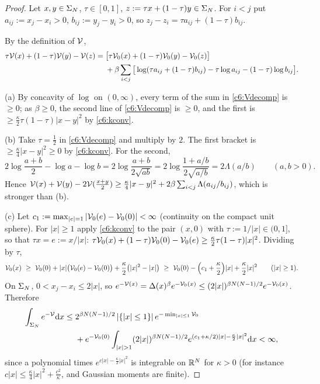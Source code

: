 \begin{proof}
Let $x,y\in\Sigma_N$, $\tau\in[0,1]$, $z:=\tau x+(1-\tau)y\in\Sigma_N$. For $i<j$ put $a_{ij}:=x_j-x_i>0$, $b_{ij}:=y_j-y_i>0$, so $z_j-z_i=\tau a_{ij}+(1-\tau)b_{ij}$.

By the definition of $\mathcal{V}$,
\begin{align}\label{c6:Vdecomp}
\tau\mathcal{V}(x)+(1-\tau)\mathcal{V}(y)-\mathcal{V}(z)={}&\big[\tau\mathcal{V}_0(x)+(1-\tau)\mathcal{V}_0(y)-\mathcal{V}_0(z)\big]\notag\\
&+\beta\sum_{i<j}\big[\log(\tau a_{ij}+(1-\tau)b_{ij})-\tau\log a_{ij}-(1-\tau)\log b_{ij}\big].
\end{align}

(a) By concavity of $\log$ on $(0,\infty)$, every term of the sum in \eqref{c6:Vdecomp} is $\ge0$; as $\beta\ge0$, the second line of \eqref{c6:Vdecomp} is $\ge0$, and the first is $\ge\frac\kappa2\tau(1-\tau)|x-y|^2$ by \eqref{c6:kconv}.

(b) Take $\tau=\frac12$ in \eqref{c6:Vdecomp} and multiply by $2$. The first bracket is $\ge\frac\kappa4|x-y|^2\ge0$ by \eqref{c6:kconv}. For the second,
\[2\log\frac{a+b}2-\log a-\log b=2\log\frac{a+b}{2\sqrt{ab}}=2\log\frac{1+a/b}{2\sqrt{a/b}}=2\Lambda(a/b)\qquad(a,b>0).\]
Hence $\mathcal{V}(x)+\mathcal{V}(y)-2\mathcal{V}(\frac{x+y}2)\ge\frac\kappa4|x-y|^2+2\beta\sum_{i<j}\Lambda(a_{ij}/b_{ij})$, which is stronger than (b).

(c) Let $c_1:=\max_{|e|=1}|\mathcal{V}_0(e)-\mathcal{V}_0(0)|<\infty$ (continuity on the compact unit sphere).
For $|x|\ge1$ apply \eqref{c6:kconv} to the pair $(x,0)$ with $\tau:=1/|x|\in(0,1]$, so that $\tau x=e:=x/|x|$:
$\tau\mathcal{V}_0(x)+(1-\tau)\mathcal{V}_0(0)-\mathcal{V}_0(e)\ge\frac\kappa2\tau(1-\tau)|x|^2$. Dividing by $\tau$,
\[\cV_0(x)\ \ge\ \cV_0(0)+|x|\big(\cV_0(e)-\cV_0(0)\big)+\frac\kappa2\big(|x|^2-|x|\big)\ \ge\ \cV_0(0)-\Big(c_1+\frac\kappa2\Big)|x|+\frac\kappa2|x|^2\qquad(|x|\ge1).\]
On $\Sigma_N$, $0<x_j-x_i\le2|x|$, so $e^{-\mathcal{V}(x)}=\Delta(x)^\beta e^{-\mathcal{V}_0(x)}\le(2|x|)^{\beta N(N-1)/2}e^{-\mathcal{V}_0(x)}$. Therefore
\begin{align*}
\int_{\Sig}e^{-\cV}\rd x\le{}&2^{\beta N(N-1)/2}\,|\{|x|\le1\}|\,e^{-\min_{|x|\le1}\cV_0}\\
&+e^{-\cV_0(0)}\int_{|x|>1}(2|x|)^{\beta N(N-1)/2}e^{(c_1+\kappa/2)|x|-\frac\kappa2|x|^2}\rd x<\infty,
\end{align*}
since a polynomial times $e^{c|x|-\frac\kappa2|x|^2}$ is integrable on $\mathbb{R}^N$ for $\kappa>0$ (for instance $c|x|\le\frac\kappa4|x|^2+\frac{c^2}{\kappa}$, and Gaussian moments are finite).
\end{proof}

